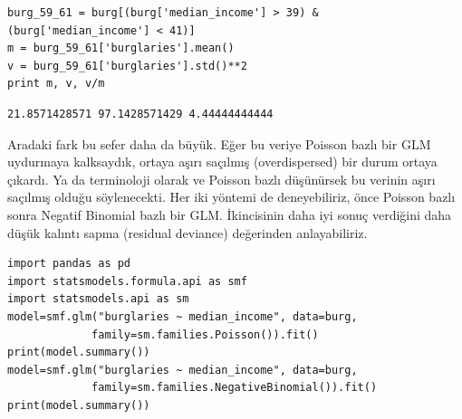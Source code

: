 \documentclass[12pt,fleqn]{article}\usepackage{../../common}
\begin{document}
\begin{verbatim}
burg_59_61 = burg[(burg['median_income'] > 39) & (burg['median_income'] < 41)]
m = burg_59_61['burglaries'].mean()
v = burg_59_61['burglaries'].std()**2
print m, v, v/m
\end{verbatim}

\begin{verbatim}
21.8571428571 97.1428571429 4.44444444444
\end{verbatim}

Aradaki fark bu sefer daha da büyük. Eğer bu veriye Poisson bazlı bir GLM
uydurmaya kalksaydık, ortaya aşırı saçılmış (overdispersed) bir durum
ortaya çıkardı. Ya da terminoloji olarak ve Poisson bazlı düşünürsek bu
verinin aşırı saçılmış olduğu söylenecekti. Her iki yöntemi de
deneyebiliriz, önce Poisson bazlı sonra Negatif Binomial bazlı bir
GLM. İkincisinin daha iyi sonuç verdiğini daha düşük kalıntı sapma
(residual deviance) değerinden anlayabiliriz.

\begin{verbatim}
import pandas as pd
import statsmodels.formula.api as smf
import statsmodels.api as sm
model=smf.glm("burglaries ~ median_income", data=burg,
             family=sm.families.Poisson()).fit()
print(model.summary())
model=smf.glm("burglaries ~ median_income", data=burg,
             family=sm.families.NegativeBinomial()).fit()
print(model.summary())
\end{verbatim}
\end{document}
